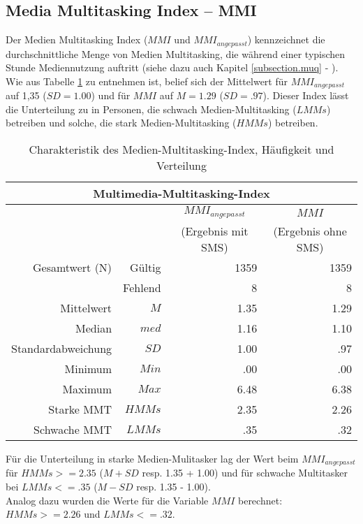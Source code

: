 \subsection{Media Multitasking Index -- MMI}
Der Medien Multitasking Index ($MMI$ und $MMI_{angepasst}$) kennzeichnet die durchschnittliche Menge von Medien Multitasking, die während einer typischen Stunde Mediennutzung auftritt (siehe dazu auch Kapitel \ref{subsection.muq} - ). Wie aus Tabelle \ref{table.deskrptMedien} zu entnehmen ist, belief sich der Mittelwert für $MMI_{angepasst}$ auf 1,35 ($SD =  1.00$) und für $MMI$ auf $M = 1.29$ ($SD = .97$). Dieser Index lässt die Unterteilung zu in Personen, die schwach Medien-Multitasking ($LMMs$) betreiben und solche, die stark Medien-Multitasking ($HMMs$) betreiben.\\
\begin{table}[ht] 
    \centering
    \caption{Charakteristik des Medien-Multitasking-Index, Häufigkeit und Verteilung}
    \begin{tabular}[t]{|r r|r|r|} 
        \hline
        \multicolumn{4}{|c|}{\textbf{Multimedia-Multitasking-Index}}\\ 
        \hline       
        \multicolumn{2}{|c}{} & \multicolumn{1}{c|}{$MMI_{angepasst}$} & \multicolumn{1}{|c|}{$MMI$}\\
        \multicolumn{2}{|c}{} & \multicolumn{1}{c|}{(Ergebnis mit SMS)} & \multicolumn{1}{|c|}{(Ergebnis ohne SMS)}\\
        \hline
        Gesamtwert (N) & Gültig & 1359 & 1359\\
        & Fehlend & 8 & 8\\
        Mittelwert & $M$ & 1.35 & 1.29\\
        Median & $med$ & 1.16 & 1.10\\
        Standardabweichung & $SD$ & 1.00 & .97\\
        Minimum & $Min$ & .00 & .00\\
        Maximum & $Max$ & 6.48 & 6.38\\
        Starke MMT & $HMMs$ & 2.35 & 2.26\\
        Schwache MMT & $LMMs$ & .35 & .32\\
        \hline
    \end{tabular}
    \label{table.deskrptMedien}
\end{table}
Für die Unterteilung in starke Medien-Mulitasker lag der Wert beim $MMI_{angepasst}$ für $HMMs >= 2.35$ ($M + SD$ resp. 1.35 + 1.00) und für schwache Multitasker bei $LMMs <= .35$ ($M - SD$ resp. 1.35 - 1.00). \\
Analog dazu wurden die Werte für die Variable $MMI$ berechnet: $HMMs >= 2.26$ und $LMMs <= .32$. \\

